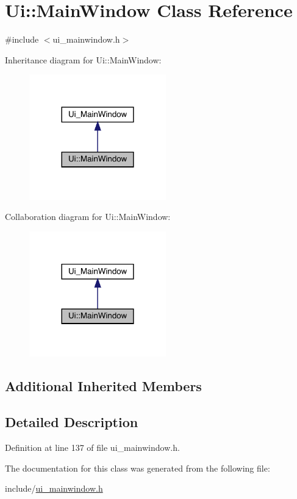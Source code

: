 \hypertarget{class_ui_1_1_main_window}{}\section{Ui\+:\+:Main\+Window Class Reference}
\label{class_ui_1_1_main_window}


{\ttfamily \#include $<$ui\+\_\+mainwindow.\+h$>$}



Inheritance diagram for Ui\+:\+:Main\+Window\+:
\nopagebreak
\begin{figure}[H]
\begin{center}
\leavevmode
\includegraphics[width=168pt]{class_ui_1_1_main_window__inherit__graph}
\end{center}
\end{figure}


Collaboration diagram for Ui\+:\+:Main\+Window\+:
\nopagebreak
\begin{figure}[H]
\begin{center}
\leavevmode
\includegraphics[width=168pt]{class_ui_1_1_main_window__coll__graph}
\end{center}
\end{figure}
\subsection*{Additional Inherited Members}


\subsection{Detailed Description}


Definition at line 137 of file ui\+\_\+mainwindow.\+h.



The documentation for this class was generated from the following file\+:\begin{DoxyCompactItemize}
\item 
include/\mbox{\hyperlink{ui__mainwindow_8h}{ui\+\_\+mainwindow.\+h}}\end{DoxyCompactItemize}

